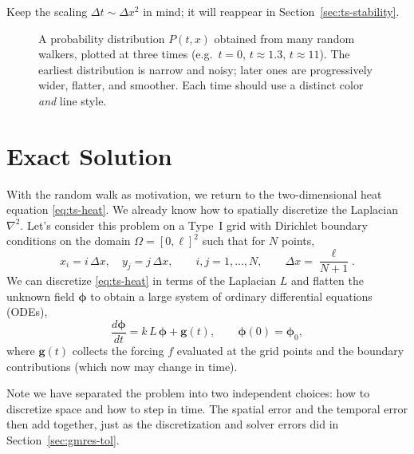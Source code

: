 \begin{remark}
Keep the scaling $\Delta t \sim \Delta x^2$ in mind; it will reappear in
Section~\ref{sec:ts-stability}.
\end{remark}


\begin{figure}[htbp]
  \centering
  \TSfigplaceholder{4.5cm}
  \caption{A probability distribution $P(t,x)$ obtained from many random walkers, plotted at three times (e.g.\ $t=0$, $t\approx 1.3$, $t\approx 11$). The earliest distribution is narrow and noisy; later ones are progressively wider, flatter, and smoother. Each time should use a distinct color \emph{and} line style.}
  \label{fig:ts-smoothing}
\end{figure}

\section{Exact Solution}
\label{sec:ts-mol}

With the random walk as motivation, we return to the two-dimensional heat
equation \eqref{eq:ts-heat}. We already know how to spatially discretize the Laplacian $\nabla^2$. Let's consider this problem on a Type~I grid with Dirichlet boundary conditions on the domain $\Omega = [0,\ell]^2$ such that for $N$ points,
\begin{equation}
  x_i = i\,\Delta x, \quad y_j = j\,\Delta x, \qquad i,j = 1,\dots,N,
  \qquad \Delta x = \frac{\ell}{N+1}.
  \label{eq:ts-grid}
\end{equation}
We can discretize \eqref{eq:ts-heat} in terms of the Laplacian $L$ and flatten the unknown field $\boldsymbol{\phi}$ to obtain a large system of ordinary differential equations (ODEs),
\begin{equation}
  \frac{d\boldsymbol{\phi}}{dt} = k\,L\,\boldsymbol{\phi} + \mathbf{g}(t),
  \qquad \boldsymbol{\phi}(0) = \boldsymbol{\phi}_0,
  \label{eq:ts-ode}
\end{equation}
where $\mathbf{g}(t)$ collects the forcing $f$ evaluated at the grid points
and the boundary contributions (which now may change in time). 

\begin{remark}
Note we have separated the problem into two independent choices: how
to discretize space and how to step in time. The spatial error and the
temporal error then add together, just as the discretization and solver errors did in
Section~\ref{sec:gmres-tol}.
\end{remark}

